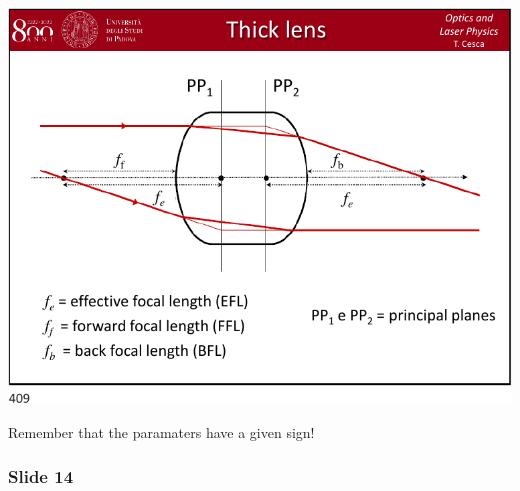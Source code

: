 \documentclass[../main/main.tex]{subfiles}
\begin{document}
\begin{minipage}[]{0.5\linewidth}
\centering
\includegraphics[page=13,width=1\textwidth]{../lessons/pdf_file/20_lecture.pdf}
\end{minipage}
\hspace{0.3cm}\vspace{0.3cm}
\begin{minipage}[c]{0.47\linewidth}

Remember that the paramaters have a given sign!

\end{minipage}

\subsubsection*{Slide 14}
\end{document}
